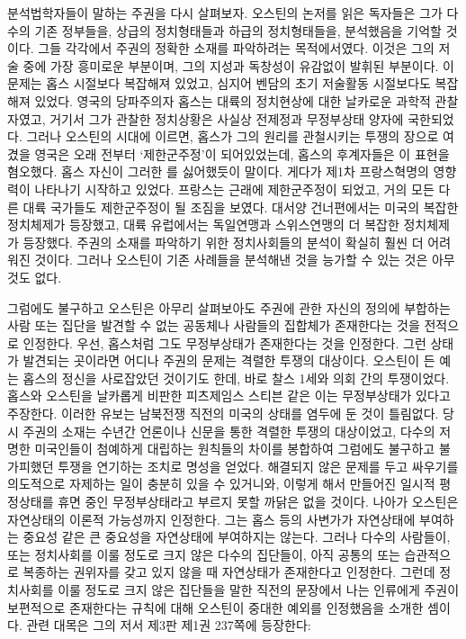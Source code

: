 분석법학자들이 말하는 주권을 다시 살펴보자.
오스틴의 논저를 읽은 독자들은
그가 다수의 기존 정부들을,
 상급의 정치형태들과 하급의 정치형태들을,
분석했음을 기억할 것이다.
그들 각각에서 주권의 정확한 소재를 파악하려는 목적에서였다.
이것은 그의 저술 중에 가장 흥미로운 부분이며,
그의 지성과 독창성이 유감없이 발휘된 부분이다.
이 문제는 홉스 시절보다 복잡해져 있었고, 심지어
벤담의 초기 저술활동 시절보다도 복잡해져 있었다.
영국의 당파주의자 홉스는 대륙의 정치현상에 대한 날카로운 과학적 관찰자였고,
거기서 그가 관찰한 정치상황은 
사실상 전제정과 무정부상태 양자에 국한되었다.
그러나 오스틴의 시대에 이르면,
홉스가 그의 원리를 관철시키는 투쟁의 장으로 여겼을 영국은
오래 전부터 `제한군주정'이 되어있었는데,
홉스의 후계자들은
이 표현을 혐오했다.
홉스 자신이 그러한 를 싫어했듯이 말이다.
게다가 제1차 프랑스혁명의 영향력이 나타나기 시작하고 있었다.
프랑스는 근래에 제한군주정이 되었고,
거의 모든 다른 대륙 국가들도 제한군주정이 될 조짐을 보였다.
대서양 건너편에서는 미국의 복잡한 정치체제가 등장했고,
대륙 유럽에서는 독일연맹과 스위스연맹의 더 복잡한 정치체제가 등장했다.
주권의 소재를 파악하기 위한 정치사회들의 분석이
확실히 훨씬 더 어려워진 것이다.
그러나
오스틴이 기존 사례들을 분석해낸 것을 능가할 수 있는 것은 아무 것도 없다.

그럼에도 불구하고 오스틴은
아무리 살펴보아도 주권에 관한 자신의 정의에 부합하는 사람 또는 집단을
발견할 수 없는 공동체나 사람들의 집합체가 존재한다는 것을 전적으로 인정한다.
우선, 홉스처럼 그도 무정부상태가 존재한다는 것을 인정한다.
그런 상태가 발견되는 곳이라면 어디나
주권의 문제는 격렬한 투쟁의 대상이다.
오스틴이 든 예는 홉스의 정신을 사로잡았던 것이기도 한데,
바로 찰스 1세와 의회 간의 투쟁이었다.
홉스와 오스틴을 날카롭게 비판한 피츠제임스 스티븐
같은 이는  무정부상태가 있다고 주장한다.
이러한 유보는 남북전쟁 직전의 미국의 상태를 염두에 둔 것이 틀림없다.
당시 주권의 소재는 수년간 언론이나 신문을 통한 격렬한 투쟁의 대상이었고,
다수의 저명한 미국인들이 첨예하게 대립하는 원칙들의 차이를 봉합하여
그럼에도 불구하고 불가피했던 투쟁을 연기하는 조치로 명성을 얻었다.
해결되지 않은 문제를 두고 싸우기를 의도적으로 자제하는 일이 충분히 있을 수
있거니와, 이렇게 해서 만들어진 일시적 평정상태를 휴면 중인 무정부상태라고
부르지 못할 까닭은 없을 것이다.
나아가 오스틴은 자연상태의 이론적 가능성까지 인정한다.
그는 홉스 등의 사변가가 자연상태에 부여하는 중요성 같은
큰 중요성을 자연상태에 부여하지는 않는다.
그러나 다수의 사람들이, 또는
정치사회를 이룰 정도로 크지 않은 다수의 집단들이,
아직 공통의 또는 습관적으로 복종하는 권위자를 갖고 있지 않을 때
자연상태가 존재한다고 인정한다.
그런데
정치사회를 이룰 정도로 크지 않은 집단들을 말한 직전의 문장에서
나는 인류에게 주권이 보편적으로 존재한다는 규칙에 대해 오스틴이 중대한 예외를
인정했음을 소개한 셈이다.
관련 대목은 그의 저서 제3판 제1권 237쪽에 등장한다:

